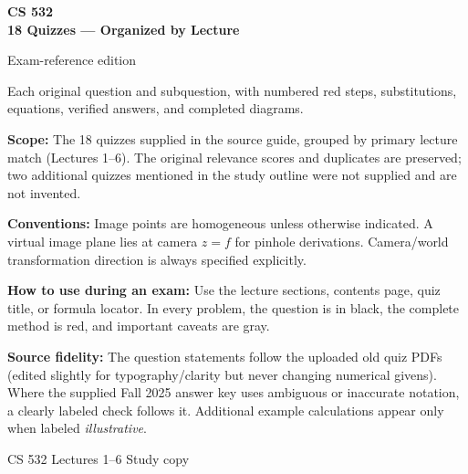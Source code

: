 \documentclass[10pt,letterpaper]{article}
\begin{document}
\begin{titlepage}
\centering\vspace*{1.1in}
{\color{navy}\Huge\bfseries CS 532\\[8pt] 18 Quizzes --- Organized by Lecture}\par\vspace{.3in}
{\Large Exam-reference edition}\par\vspace{.4in}
{\large Each original question and subquestion, with \textcolor{solveRed}{numbered red steps}, substitutions, equations, verified answers, and completed diagrams.}\par\vspace{.7in}
\begin{minipage}{.82\linewidth}
\textbf{Scope:} The 18 quizzes supplied in the source guide, grouped by primary lecture match (Lectures 1--6). The original relevance scores and duplicates are preserved; two additional quizzes mentioned in the study outline were not supplied and are not invented.\par\medskip
\textbf{Conventions:} Image points are homogeneous unless otherwise indicated. A virtual image plane lies at camera $z=f$ for pinhole derivations. Camera/world transformation direction is always specified explicitly.\par\medskip
\textbf{How to use during an exam:} Use the lecture sections, contents page, quiz title, or formula locator. In every problem, the question is in black, the complete method is \textcolor{solveRed}{red}, and important caveats are gray.\par\medskip
\textbf{Source fidelity:} The question statements follow the uploaded old quiz PDFs (edited slightly for typography/clarity but never changing numerical givens). Where the supplied Fall 2025 answer key uses ambiguous or inaccurate notation, a clearly labeled check follows it. Additional example calculations appear only when labeled \emph{illustrative}.\par
\end{minipage}
\vfill
{\color{muted}\large CS 532 \textbar{} Lectures 1--6 \textbar{} Study copy}\par
\end{titlepage}
\tableofcontents\clearpage
\end{document}
